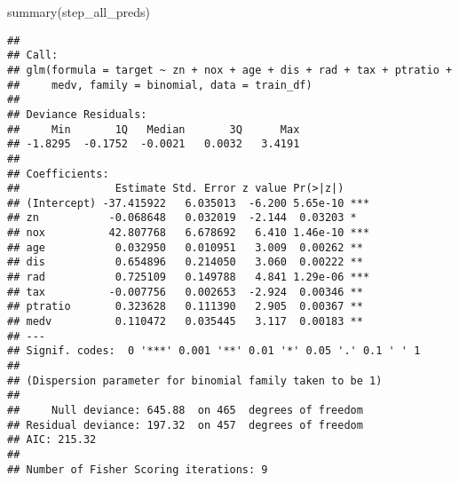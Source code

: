 \documentclass[
]{article}
\newenvironment{Shaded}{\begin{snugshade}}{\end{snugshade}}
\newcommand{\AttributeTok}[1]{\textcolor[rgb]{0.77,0.63,0.00}{#1}}
\newcommand{\CommentTok}[1]{\textcolor[rgb]{0.56,0.35,0.01}{\textit{#1}}}
\newcommand{\DecValTok}[1]{\textcolor[rgb]{0.00,0.00,0.81}{#1}}
\newcommand{\FloatTok}[1]{\textcolor[rgb]{0.00,0.00,0.81}{#1}}
\newcommand{\FunctionTok}[1]{\textcolor[rgb]{0.00,0.00,0.00}{#1}}
\newcommand{\NormalTok}[1]{#1}
\newcommand{\OtherTok}[1]{\textcolor[rgb]{0.56,0.35,0.01}{#1}}
\newcommand{\SpecialCharTok}[1]{\textcolor[rgb]{0.00,0.00,0.00}{#1}}
\newcommand{\StringTok}[1]{\textcolor[rgb]{0.31,0.60,0.02}{#1}}
\begin{document}
\begin{Shaded}
\begin{Highlighting}[]
\FunctionTok{summary}\NormalTok{(step\_all\_preds)}
\end{Highlighting}
\end{Shaded}

\begin{verbatim}
## 
## Call:
## glm(formula = target ~ zn + nox + age + dis + rad + tax + ptratio + 
##     medv, family = binomial, data = train_df)
## 
## Deviance Residuals: 
##     Min       1Q   Median       3Q      Max  
## -1.8295  -0.1752  -0.0021   0.0032   3.4191  
## 
## Coefficients:
##               Estimate Std. Error z value Pr(>|z|)    
## (Intercept) -37.415922   6.035013  -6.200 5.65e-10 ***
## zn           -0.068648   0.032019  -2.144  0.03203 *  
## nox          42.807768   6.678692   6.410 1.46e-10 ***
## age           0.032950   0.010951   3.009  0.00262 ** 
## dis           0.654896   0.214050   3.060  0.00222 ** 
## rad           0.725109   0.149788   4.841 1.29e-06 ***
## tax          -0.007756   0.002653  -2.924  0.00346 ** 
## ptratio       0.323628   0.111390   2.905  0.00367 ** 
## medv          0.110472   0.035445   3.117  0.00183 ** 
## ---
## Signif. codes:  0 '***' 0.001 '**' 0.01 '*' 0.05 '.' 0.1 ' ' 1
## 
## (Dispersion parameter for binomial family taken to be 1)
## 
##     Null deviance: 645.88  on 465  degrees of freedom
## Residual deviance: 197.32  on 457  degrees of freedom
## AIC: 215.32
## 
## Number of Fisher Scoring iterations: 9
\end{verbatim}

\begin{Shaded}
\end{Shaded}
\end{document}
